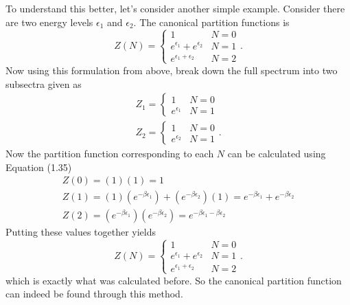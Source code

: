 To understand this better, let's consider another simple example. Consider there are two energy levels $\epsilon_1$ and $\epsilon_2$. The canonical partition functions is 
\begin{equation}
    Z(N) = \begin{cases}
    1 & N=0\\
    e^{\epsilon_1}+e^{\epsilon_2} & N=1\\
    e^{\epsilon_1+\epsilon_2} & N=2
    \end{cases}.
\end{equation}
Now using this formulation from above, break down the full spectrum into two subsectra given as 
\begin{gather}
    Z_1=\begin{cases}1&N=0\\e^{\epsilon_1}& N=1\end{cases}\\
    Z_2=\begin{cases}1&N=0\\e^{\epsilon_2}& N=1\end{cases}.
\end{gather}
Now the partition function corresponding to each $N$ can be calculated using Equation (1.35)  
\begin{gather}
    Z(0)= (1)(1)=1\\
    Z(1)= (1)(e^{-\beta\epsilon_1})+(e^{-\beta\epsilon_2})(1)=e^{-\beta\epsilon_1}+e^{-\beta\epsilon_2}\\
    Z(2)=(e^{-\beta\epsilon_1})(e^{-\beta\epsilon_2})=e^{-\beta\epsilon_1-\beta\epsilon_2}
\end{gather}
Putting these values together yields 
\begin{equation}
    Z(N) = \begin{cases}
    1 & N=0\\
    e^{\epsilon_1}+e^{\epsilon_2} & N=1\\
    e^{\epsilon_1+\epsilon_2} & N=2
    \end{cases}.
\end{equation}
which is exactly what was calculated before. So the canonical partition function can indeed be found through this method.